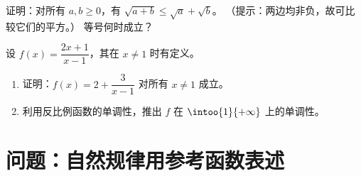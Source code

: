 \begin{exercise}[$\star\star$]\label{exo:g10:reffunc:9}
证明：对所有 $a, b \geq 0$，有 $\sqrt{a + b} \leq \sqrt a + \sqrt b$。
（提示：两边均非负，故可比较它们的平方。）
等号何时成立？
\end{exercise}

\begin{exercise}[$\star\star\star$]\label{exo:g10:reffunc:10}
设 $f(x) = \dfrac{2x + 1}{x - 1}$，其在 $x \neq 1$ 时有定义。
\begin{enumerate}
  \item 证明：$f(x) = 2 + \dfrac{3}{x - 1}$ 对所有 $x \neq 1$ 成立。
  \item 利用反比例函数的单调性，推出 $f$ 在 $\intoo{1}{+\infty}$
        上的单调性。
\end{enumerate}
\end{exercise}

\section{问题：自然规律用参考函数表述}

